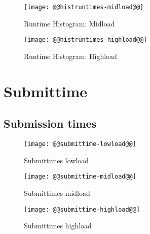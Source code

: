 \documentclass[11pt]{article}
\begin{document}
\begin{figure}[htbp]
  \begin{center}
    \texttt{[image: @@histruntimes-midload@@]}
    \caption{Runtime Histogram: Midload}
    \label{fig:rt-hist-midload}
  \end{center}
\end{figure}

\begin{figure}[htbp]
  \begin{center}
    \texttt{[image: @@histruntimes-highload@@]}
    \caption{Runtime Histogram: Highload}
    \label{fig:rt-hist-highload}
  \end{center}
\end{figure}


\newpage
\section{Submittime}

\subsection{Submission times}
\begin{figure}[htbp]
  \begin{center}
    \texttt{[image: @@submittime-lowload@@]}
    \caption{Submittimes lowload }
    \label{fig:submittime-lowload}
  \end{center}
\end{figure}
\begin{figure}[htbp]
  \begin{center}
    \texttt{[image: @@submittime-midload@@]}
    \caption{Submittimes midload }
    \label{fig:submittime-midload}
  \end{center}
\end{figure}
\begin{figure}[htbp]
  \begin{center}
    \texttt{[image: @@submittime-highload@@]}
    \caption{Submittimes highload }
    \label{fig:submittime-highload}
  \end{center}
\end{figure}

\newpage
\end{document}
